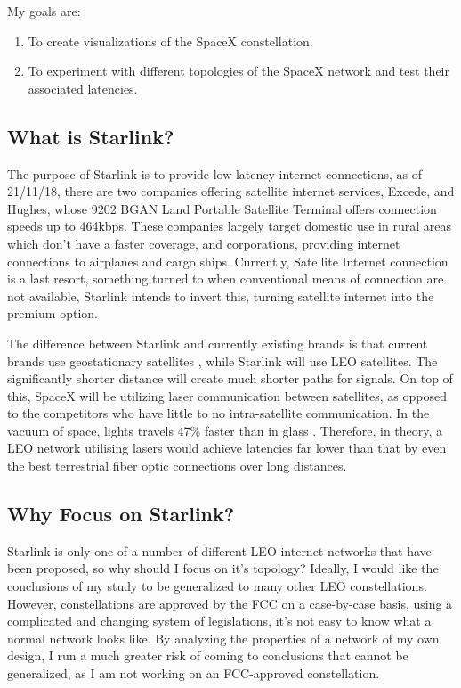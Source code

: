 \documentclass[12pt]{article}
\begin{document}
My goals are:
\begin{enumerate}
	\item To create visualizations of the SpaceX constellation.
	\item To experiment with different topologies of the SpaceX network and test their associated latencies. 
\end{enumerate}

\subsection{What is Starlink?}

The purpose of Starlink is to provide low latency internet connections, as of 21/11/18, there are two companies offering satellite internet services, Excede\cite{ExcedeWebsite}, and Hughes, whose 9202 BGAN Land Portable Satellite Terminal offers connection speeds up to 464kbps\cite{HughesWebsite}. These companies largely target domestic use in rural areas which don’t have a faster coverage, and corporations, providing internet connections to airplanes and cargo ships. Currently, Satellite Internet connection is a last resort, something turned to when conventional means of connection are not available, Starlink intends to invert this, turning satellite internet into the premium option. 

The difference between Starlink and currently existing brands is that current brands use geostationary satellites \cite{HughesPressRelease}, while Starlink will use LEO satellites. The significantly shorter distance will create much shorter paths for signals. On top of this, SpaceX will be utilizing laser communication between satellites, as opposed to the competitors who have little to no intra-satellite communication. In the vacuum of space, lights travels 47\% faster than in glass \cite{PropertiesOfGlass}. Therefore, in theory, a LEO network utilising lasers would achieve latencies far lower than that by even the best terrestrial fiber optic connections over long distances.

\subsection{Why Focus on Starlink?}

Starlink is only one of a number of different LEO internet networks that have been proposed, so why should I focus on it's topology? Ideally, I would like the conclusions of my study to be generalized to many other LEO constellations. However, constellations are approved by the FCC on a case-by-case basis, using a complicated and changing system of legislations, it's not easy to know what a normal network looks like. By analyzing the properties of a network of my own design, I run a much greater risk of coming to conclusions that cannot be generalized, as I am not working on an FCC-approved constellation.
\end{document}

